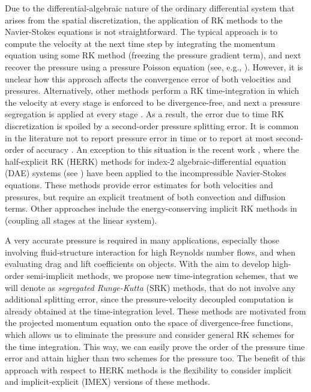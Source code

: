 Due to the differential-algebraic nature of the ordinary differential system that arises from the spatial discretization, the application of RK methods to the Navier-Stokes equations is not straightforward. The typical approach is to compute the velocity at the next time step by integrating the momentum equation using some RK method (freezing the pressure gradient term), and next recover the pressure using a pressure Poisson equation (see, e.g., \cite{nikitin_third-order-accurate_2006}). However, it is unclear how this approach affects the convergence error of both velocities and pressures. Alternatively, other methods perform a RK time-integration in which the velocity at every stage is enforced to be divergence-free, and next a pressure segregation is applied at every stage \cite{le_improvement_1991,knikker_study_2009}. As a result, the error due to time RK discretization is spoiled by a second-order pressure splitting error. It is common in the literature not to report pressure error in time \cite{nikitin_third-order-accurate_2006,kampanis_staggered_2006} or to report at most second-order of accuracy \cite{knikker_study_2009}. An exception to this situation is the recent work \cite{sanderse_accuracy_2012}, where the half-explicit RK (HERK) methods for index-2 algebraic-differential equation (DAE) systems (see \cite{hairer_solving_1993}) have been applied to the incompressible Navier-Stokes equations. These methods provide error estimates for both velocities and pressures, but require an explicit treatment of both convection and diffusion terms. Other approaches include the energy-conserving implicit RK methods in \cite{sanderse_energy-conserving_2013} (coupling all stages at the linear system). 

A very accurate pressure is required in many applications, especially those involving fluid-structure interaction for high Reynolds number flows, and when evaluating drag and lift coefficients on objects. With the aim to develop high-order semi-implicit methods, we propose new time-integration schemes, that we will denote as \emph{segregated Runge-Kutta} (SRK) methods, that do not involve any additional splitting error, since the pressure-velocity decoupled computation is already obtained at the time-integration level. These methods are motivated from the projected momentum equation onto the space of divergence-free functions, which allows us to eliminate the pressure and consider general RK schemes for the time integration. This way, we can easily prove the order of the pressure time error and attain higher than two schemes for the pressure too. The benefit of this approach with respect to HERK methods is the flexibility to consider implicit and implicit-explicit (IMEX) versions of these methods. 

